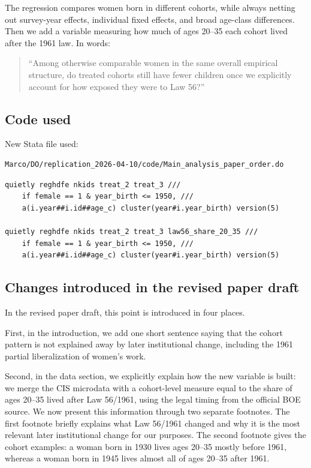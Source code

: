 \documentclass[11pt]{article}
\begin{document}
The regression compares women born in different cohorts, while always netting out survey-year effects, individual fixed effects, and broad age-class differences. Then we add a variable measuring how much of ages 20--35 each cohort lived after the 1961 law. In words:

\begin{quote}
``Among otherwise comparable women in the same overall empirical structure, do treated cohorts still have fewer children once we explicitly account for how exposed they were to Law 56?''
\end{quote}

\subsection*{Code used}

New Stata file used:

\begin{verbatim}
Marco/DO/replication_2026-04-10/code/Main_analysis_paper_order.do
\end{verbatim}

\begin{verbatim}
quietly reghdfe nkids treat_2 treat_3 ///
    if female == 1 & year_birth <= 1950, ///
    a(i.year##i.id##age_c) cluster(year#i.year_birth) version(5)

quietly reghdfe nkids treat_2 treat_3 law56_share_20_35 ///
    if female == 1 & year_birth <= 1950, ///
    a(i.year##i.id##age_c) cluster(year#i.year_birth) version(5)
\end{verbatim}

\subsection*{Changes introduced in the revised paper draft}

In the revised paper draft, this point is introduced in four places.

First, in the introduction, we add one short sentence saying that the cohort pattern is not explained away by later institutional change, including the 1961 partial liberalization of women's work.

Second, in the data section, we explicitly explain how the new variable is built: we merge the CIS microdata with a cohort-level measure equal to the share of ages 20--35 lived after Law 56/1961, using the legal timing from the official BOE source.
We now present this information through two separate footnotes. The first footnote briefly explains what Law 56/1961 changed and why it is the most relevant later institutional change for our purposes. The second footnote gives the cohort examples: a woman born in 1930 lives ages 20--35 mostly before 1961, whereas a woman born in 1945 lives almost all of ages 20--35 after 1961.
\end{document}
